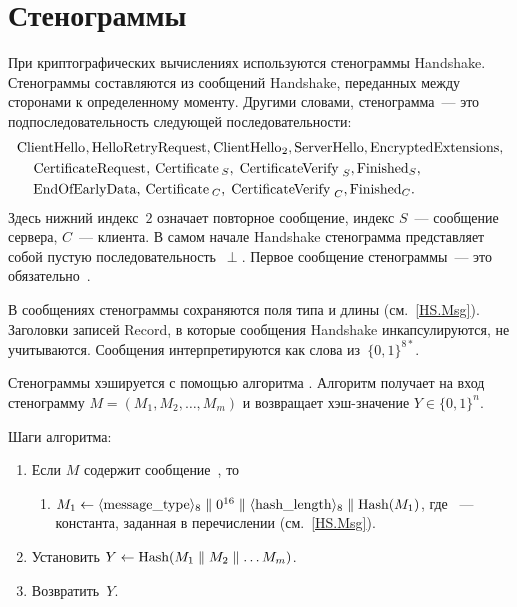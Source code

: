 \section{Стенограммы}\label{CRYPTO.Transcr} 

При криптографических вычислениях используются стенограммы Handshake.
Стенограммы составляются из сообщений Handshake, переданных между сторонами к 
определенному моменту. 
%
Другими словами, стенограмма~--- это подпоследовательность следующей 
последовательности:
\begin{align*}
&\code{ClientHello}, \code{HelloRetryRequest}, \code{ClientHello}_2, 
\code{ServerHello},\code{EncryptedExtensions},\\ 
%
&\hspace{12pt}\code{CertificateRequest}, \code{Certificate}_S, 
\code{CertificateVerify}_S, \code{Finished}_S,\\
%
&\hspace{12pt}\code{EndOfEarlyData}, \code{Certificate}_C, 
\code{CertificateVerify}_C, \code{Finished}_C.
\end{align*}
Здесь нижний индекс~$2$ означает повторное сообщение, 
индекс $S$~--- сообщение сервера, $C$~--- клиента.
%
В самом начале Handshake стенограмма представляет собой пустую 
последовательность~$\perp$. Первое сообщение стенограммы~--- это 
обязательно~.

В сообщениях стенограммы сохраняются поля типа и длины (см.~\ref{HS.Msg}). 
Заголовки записей Record, в которые сообщения Handshake инкапсулируются, не 
учитываются. Сообщения интерпретируются как слова из~$\{0,1\}^{8*}$. 

Стенограммы хэшируется с помощью алгоритма . 
Алгоритм получает на вход стенограмму $M=(M_1,M_2,\ldots,M_m)$
и возвращает хэш-значение $Y\in\{0,1\}^n$.

Шаги алгоритма:
\begin{enumerate}
\item
Если $M$ содержит сообщение~, то 
\begin{enumerate}
\item
$M_1\gets\itob{\code{message_type}}_8\parallel 0^{16}\parallel
\itob{\code{hash_length}}_8\parallel\code{Hash}(M_1)$,
где ~--- константа, заданная в перечислении
 (см.~\ref{HS.Msg}).
\end{enumerate}
\item
Установить $Y\gets\code{Hash}(M_1\parallel M_2\parallel\ldots M_m)$.
\item
Возвратить~$Y$.
\end{enumerate}

